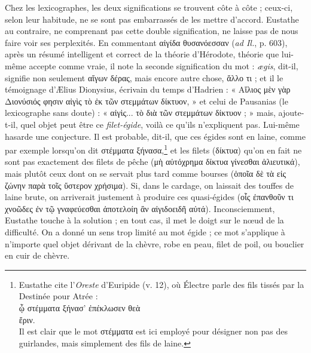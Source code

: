 \documentclass[a4paper, 11pt, oneside, polutonikogreek, french]{article}
\begin{document}
Chez les lexicographes, les deux significations se trouvent côte à côte ; ceux-ci, selon leur habitude, ne se sont pas embarrassés de les mettre d'accord. Eustathe au contraire, ne comprenant pas cette double signification, ne laisse pas de nous faire voir ses perplexités. En commentant αἰγίδα θυσανόεσσαν (\emph{ad Il.}, p. 603), après un résumé intelligent et correct de la théorie d'Hérodote, théorie que lui-même accepte comme vraie, il note la seconde signification du mot : \emph{ægis}, dit-il, signifie non seulement αἴγων δέρας, mais encore autre chose, ἄλλο τι ; et il le témoignage d'Ælius Dionysius, écrivain du temps d'Hadrien : « Αἴλιος μὲν γὰρ Διονύσιός φησιν αἰγὶς τὸ ἐκ τῶν στεμμάτων δίκτυον, » et celui de Pausanias (le lexicographe sans doute) : « αἰγὶς... τὸ διὰ τῶν στεμμάτων δίκτυον ; » mais, ajoute-t-il, quel objet peut être ce \emph{filet-égide}, voilà ce qu'ils n'expliquent pas. Lui-même hasarde une conjecture. Il est probable, dit-il, que ces égides sont en laine, comme par exemple lorsqu'on dit στέμματα ξήνασα,\footnote{Eustathe cite l'\emph{Oreste} d'Euripide (v. 12), où Électre parle des fils tissés par la Destinée pour Atrée :\\\hspace*{10mm}ᾦ στέμματα ξήνασ' ἐπέκλωσεν θεὰ\\\hspace*{10mm}ἔριν.\\\hspace*{10mm}Il est clair que le mot στέμματα est ici employé pour désigner non pas des guirlandes, mais simplement des fils de laine.} et les filets (δίκτυα) qu'on en fait ne sont pas exactement des filets de pêche (μὴ αὐτόχρημα δίκτυα γίνεσθαι ἁλιευτικά), mais plutôt ceux dont on se servait plus tard comme bourses (ὁποῖα δὲ τὰ εἰς ζώνην παρὰ τοῖς ὕστερον χρήσιμα). Si, dans le cardage, on laissait des touffes de laine brute, on arriverait justement à produire ces quasi-égides (οἷς ἐπανθοῦν τι χνοῶδες ἐν τῷ γναφεύεσθαι ἀποτελοίη ἂν αἰγιδοειδῆ αὐτά). Inconsciemment, Eustathe touche à la solution ; en tout cas, il met le doigt sur le nœud de la difficulté. On a donné un sens trop limité au mot égide ; ce mot s'applique à n'importe quel objet dérivant de la chèvre, robe en peau, filet de poil, ou bouclier en cuir de chèvre.
\end{document}
